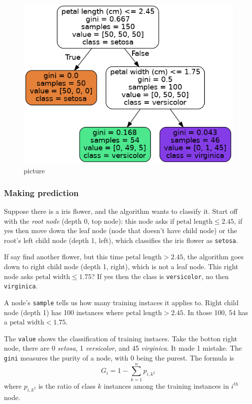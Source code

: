 \documentclass[
  letterpaper,
  DIV=11,
  numbers=noendperiod]{scrartcl}
\begin{document}
\begin{figure}[H]

{\centering \includegraphics{iris_tree.png}

}

\caption{picture}

\end{figure}%

\subsubsection{Making prediction}\label{making-prediction}

Suppose there is a iris flower, and the algorithm wants to classify it.
Start off with the \emph{root node} (depth 0, top node): this node asks
if \(\text{petal length} \leq 2.45\), if yes then move down the leaf
node (node that doesn't have child node) or the root's left child node
(depth 1, left), which classifies the iris flower as \texttt{setosa}.

If say find another flower, but this time
\(\text{petal length} > 2.45\), the algorithm goes down to right child
node (depth 1, right), which is not a leaf node. This right node asks
\(\text{petal width} \leq 1.75\)? If yes then the class is
\texttt{versicolor}, no then \texttt{virginica}.

A node's \texttt{sample} tells us how many training instaces it applies
to. Right child node (depth 1) has 100 instances where
\(\text{petal length} > 2.45\). In those 100, 54 has a
\(\text{petal width} < 1.75\).

The \texttt{value} shows the classification of training instaces. Take
the botton right node, there are 0 \emph{setosa}, 1 \emph{versicolor},
and 45 \emph{virginica}. It made 1 mistake. The \texttt{gini} measures
the purity of a node, with 0 being the purest. The formula is \[
G_i = 1 - \sum_{k=1}^np_{i,k^2}
\] where \(p_{i,k^2}\) is the ratio of class \(k\) instances among the
training instances in \(i^{th}\) node.
\end{document}
